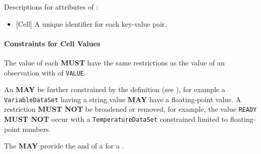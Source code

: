 Descriptions for attributes of :

\begin{itemize}

\item {}[Cell] \newline A unique identifier for each \gls{key-value pair}.
\end{itemize}


\paragraph{Constraints for Cell Values}
\label{sec:Constraints for Cell Values}

The value of each  \textbf{MUST} have the same restrictions as the value of an \gls{observation} with  of \texttt{VALUE}.

An  \textbf{MAY} be further constrained by the  definition (see ), for example a \texttt{VariableDataSet} having a string value \textbf{MAY} have a floating-point  value. A restriction \textbf{MUST NOT} be broadened or removed, for example, the value \texttt{READY} \textbf{MUST NOT} occur with a \texttt{TemperatureDataSet} constrained limited to floating-point numbers.

The    \textbf{MAY} provide the  and  of a  for a .

